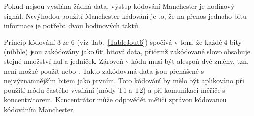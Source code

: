 Pokud nejsou vysílána žádná data, výstup kódování Manchester je hodinový signál. Nevýhodou použití Manchester kódování je to, že na přenos jednoho bitu informace je potřeba dvou hodinových taktů.

Princip kódování 3 ze 6 (viz Tab.~\ref{Table3out6}) spočívá v tom, že každé 4 bity (nibble) jsou zakódovány jako 6ti bitová data, přičemž zakódované slovo obsahuje stejné množství nul a jedniček. Zároveň v kódu musí být alespoň dvě změny, tzn. není možné použít  nebo . Takto zakódovaná data jsou přenášené s nejvýznamnějším bitem jako prvním. Toto kódování by mělo být aplikováno při použití módu častého vysílání (módy T1 a T2) a při komunikaci měřiče s koncentrátorem. Koncentrátor může odpovědět měřiči zprávou kódovanou kódováním Manchester.


\begin{table}[!ht]
\centering
\caption{Tabulka kódování 3 ze 6 \cite{WMencodeing}}
\label{Table3out6}
\end{table}
